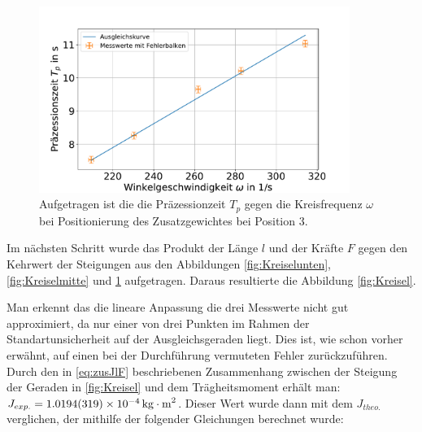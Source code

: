 \begin{figure}[h]
	\centering
	\includegraphics[width=0.9\textwidth]{res/sproHzoben.pdf}
	\caption{Aufgetragen ist die die Präzessionzeit $T_p$ gegen die Kreisfrequenz $\omega$ bei Positionierung des Zusatzgewichtes bei Position 3.}
		\label{fig:Kreiseloben}
	\end{figure}
Im nächsten Schritt wurde das Produkt der Länge $l$ und der Kräfte $F$ gegen den Kehrwert der Steigungen aus den Abbildungen  \ref{fig:Kreiselunten}, \ref{fig:Kreiselmitte} und \ref{fig:Kreiseloben} aufgetragen. 
Daraus resultierte die Abbildung \ref{fig:Kreisel}.

Man erkennt das die lineare Anpassung die drei Messwerte nicht gut approximiert, da nur einer von drei Punkten im Rahmen der Standartunsicherheit auf der Ausgleichsgeraden liegt. Dies ist, wie schon vorher erwähnt, auf einen bei der Durchführung vermuteten Fehler zurückzuführen.
Durch den in \ref{eq:zusJlF} beschriebenen Zusammenhang zwischen der Steigung der Geraden in \cref{fig:Kreisel} und dem Trägheitsmoment erhält man:  $J_{exp.}=\SI{1,0194+-0,0319e-4}{kg \cdot m^2}$. 
Dieser Wert wurde dann mit dem $J_{theo.}$ verglichen, der mithilfe der folgender Gleichungen berechnet wurde:


